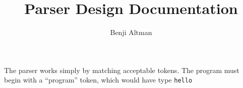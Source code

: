 \documentclass{article}
\author{Benji Altman}
\title{Parser Design Documentation}
\begin{document}
\maketitle

The parser works simply by matching acceptable tokens. The program must begin with a ``program'' token, which would have type \texttt{hello}
\end{document}
